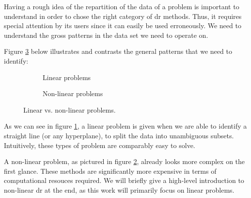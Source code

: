Having a rough idea of the repartition of the data of a problem is important to understand in order to chose the right category of \gls{dr} methods.
Thus, it requires special attention by its users since it can easily be used erroneously.
We need to understand the gross patterns in the data set we need to operate on.
\bigskip

Figure \ref{fig:linearvsnonlinearproblems} below illustrates and contrasts the general patterns that we need to identify:%
\vspace*{2mm}

\renewcommand{\tikzscale}{1.2}
\begin{figure}[h]
	\begin{subfigure}{0.49\textwidth}
	    \caption{Linear problems}
		
	    \label{subfig:linearproblems}
	\end{subfigure}
	\hfill
	\begin{subfigure}{0.49\textwidth}
	    \caption{Non-linear problems}
		
	    \label{subfig:nonlinearproblems}
	\end{subfigure}
\caption{Linear vs. non-linear problems.}
\label{fig:linearvsnonlinearproblems}
\end{figure}
\bigskip

As we can see in figure \ref{subfig:linearproblems}, a linear problem is given when we are able to identify a straight line (or any \gls{hyperplane}), to split the data into unambiguous subsets.
Intuitively, these types of problem are comparably easy to solve.
\medskip

A non-linear problem, as pictured in figure \ref{subfig:nonlinearproblems}, already looks more complex on the first glance.
These methods are significantly more expensive in terms of computational resouces required.
We will briefly give a high-level introduction to non-linear \acrlong{dr} at the end, as this work will primarily focus on linear problems.
